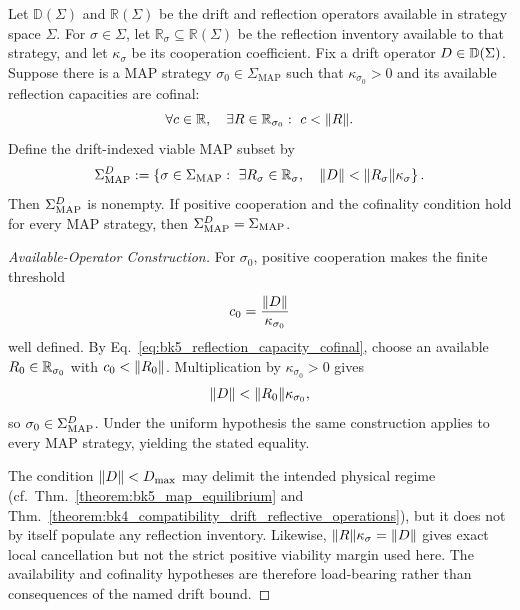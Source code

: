 \begin{theorem} \label{theorem:bk5_rift_reflection_balance_in_strategy_space}
Let $\mathbb{D}(\Sigma)$ and $\mathbb{R}(\Sigma)$ be the drift and reflection
operators available in strategy space $\Sigma$.  For $\sigma\in\Sigma$, let
$\mathbb{R}_{\sigma}\subseteq\mathbb{R}(\Sigma)$ be the reflection inventory
available to that strategy, and let $\kappa_\sigma$ be its cooperation
coefficient.  Fix a drift operator $D\in\mathbb{D}(\Sigma)$.  Suppose
there is a MAP strategy $\sigma_0\in\Sigma_{\mathrm{MAP}}$ such that
$\kappa_{\sigma_0}>0$ and its available reflection capacities are cofinal:
\begin{equation}
 \forall c\in\mathbb{R},\quad
 \exists R\in\mathbb{R}_{\sigma_0}:\ c<\lVert R\rVert.
 \label{eq:bk5_reflection_capacity_cofinal}
\end{equation}
Define the drift-indexed viable MAP subset by
\begin{equation}
 \Sigma_{\mathrm{MAP}}^{D}:=
 \left\{\sigma\in\Sigma_{\mathrm{MAP}}:\
 \exists R_\sigma\in\mathbb{R}_{\sigma},\quad
 \lVert D\rVert<\lVert R_\sigma\rVert\kappa_\sigma\right\}.
 \label{eq:bk5_viable_map_inventory}
\end{equation}
Then $\Sigma_{\mathrm{MAP}}^{D}$ is nonempty.  If positive cooperation
and the cofinality condition hold for every MAP strategy, then
$\Sigma_{\mathrm{MAP}}^{D}=\Sigma_{\mathrm{MAP}}$.
\end{theorem}
\begin{proof}[Available-Operator Construction]
\label{proof:bk5_drift_reflection_equilibrium}
For $\sigma_0$, positive cooperation makes the finite threshold
\[
 c_0=\frac{\lVert D\rVert}{\kappa_{\sigma_0}}
\]
well defined.  By Eq.~\eqref{eq:bk5_reflection_capacity_cofinal}, choose an
available $R_0\in\mathbb{R}_{\sigma_0}$ with
$c_0<\lVert R_0\rVert$.  Multiplication by
$\kappa_{\sigma_0}>0$ gives
\[
 \lVert D\rVert<\lVert R_0\rVert\kappa_{\sigma_0},
\]
so $\sigma_0\in\Sigma_{\mathrm{MAP}}^{D}$.  Under the uniform
hypothesis the same construction applies to every MAP strategy, yielding the
stated equality.

The condition $\lVert D\rVert<D_{\max}$ may delimit the intended
physical regime (cf.~Thm.~\ref{theorem:bk5_map_equilibrium} and
Thm.~\ref{theorem:bk4_compatibility_drift_reflective_operations}), but it does
not by itself populate any reflection inventory.  Likewise,
$\lVert R\rVert\kappa_\sigma=\lVert D\rVert$ gives exact local
cancellation but not the strict positive viability margin used here.  The
availability and cofinality hypotheses are therefore load-bearing rather than
consequences of the named drift bound.
\end{proof}
